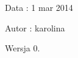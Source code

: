 \begin{DoxyDate}{Data}
\-: 1 mar 2014 
\end{DoxyDate}
\begin{DoxyAuthor}{Autor}
\-: karolina 
\end{DoxyAuthor}
\begin{DoxyVersion}{Wersja}
0. 
\end{DoxyVersion}
